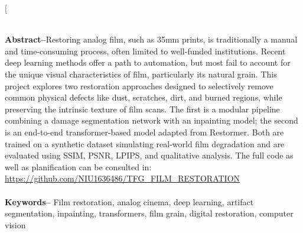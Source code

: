 \documentclass[10pt,a4paper,twocolumn,twoside]{article}
\begin{document}
\twocolumn[\begin{@twocolumnfalse}

\renewcommand{\refname}{References}
\maketitle

\thispagestyle{primerapagina}
\begin{center}
\parbox{0.915\textwidth}
{\sffamily \small
\\
\textbf{Abstract--}Restoring analog film, such as 35mm prints, is traditionally a manual and time-consuming process, often limited to well-funded institutions. Recent deep learning methods offer a path to automation, but most fail to account for the unique visual characteristics of film, particularly its natural grain. This project explores two restoration approaches designed to selectively remove common physical defects like dust, scratches, dirt, and burned regions, while preserving the intrinsic texture of film scans. The first is a modular pipeline combining a damage segmentation network with an inpainting model; the second is an end-to-end transformer-based model adapted from Restormer. Both are trained on a synthetic dataset simulating real-world film degradation and are evaluated using SSIM, PSNR, LPIPS, and qualitative analysis. The full code as well as planification can be consulted in: \url{https://github.com/NIU1636486/TFG_FILM_RESTORATION}
\\
\\
\textbf{Keywords-- } Film restoration, analog cinema, deep learning, artifact segmentation, inpainting, transformers, film grain, digital restoration, computer vision\\
}

\bigskip

{\vrule depth 0pt height 0.5pt width 4cm\hspace{7.5pt}%
%
\hspace{7.5pt}\vrule depth 0pt height 0.5pt width 4cm\relax}


\end{center}
\end{@twocolumnfalse}
\end{document}
